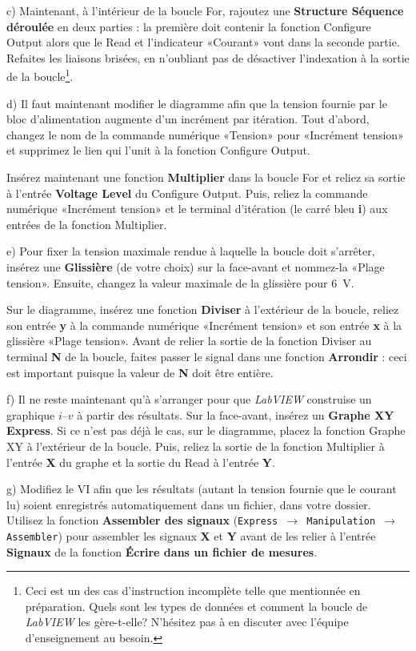 \documentclass[canadien,12pt,oneside,letterpaper]{article}
\begin{document}
c) Maintenant, à l'intérieur de la boucle For, rajoutez une \textbf{Structure Séquence déroulée} en deux parties : la première doit contenir la fonction Configure Output alors que le Read et l'indicateur «Courant» vont dans la seconde partie. Refaites les liaisons brisées, en n'oubliant pas de désactiver l'indexation à la sortie de la boucle\footnote{Ceci est un des cas d'instruction incomplète telle que mentionnée en préparation. Quels sont les types de données et comment la boucle de \textit{LabVIEW} les gère-t-elle? N'hésitez pas à en discuter avec l'équipe d'enseignement au besoin.}.

d) Il faut maintenant modifier le diagramme afin que la tension fournie par le bloc d'alimentation augmente d'un incrément par itération. Tout d'abord, changez le nom de la commande numérique «Tension» pour «Incrément tension» et supprimez le lien qui l'unit à la fonction Configure Output.

Insérez maintenant une fonction \textbf{Multiplier} dans la boucle For et reliez sa sortie à l'entrée \textbf{Voltage Level} du Configure Output. Puis, reliez la commande numérique «Incrément tension» et le terminal d'itération (le carré bleu \textbf{i}) aux entrées de la fonction Multiplier.

e) Pour fixer la tension maximale rendue à laquelle la boucle doit s'arrêter, insérez une \textbf{Glissière} (de votre choix) sur la face-avant et nommez-la «Plage tension». Ensuite, changez la valeur maximale de la glissière pour 6~V.

Sur le diagramme, insérez une fonction \textbf{Diviser} à l'extérieur de la boucle, reliez son entrée \textbf{y} à la commande numérique «Incrément tension» et son entrée \textbf{x} à la glissière «Plage tension». Avant de relier la sortie de la fonction Diviser au terminal \textbf{N} de la boucle, faites passer le signal dans une fonction \textbf{Arrondir} : ceci est important puisque la valeur de \textbf{N} doit être entière.

f) Il ne reste maintenant qu'à s'arranger pour que \textit{LabVIEW} construise un graphique $i$--$v$ à partir des résultats. Sur la face-avant, insérez un \textbf{Graphe XY Express}. Si ce n'est pas déjà le cas, sur le diagramme, placez la fonction Graphe XY à l'extérieur de la boucle. Puis, reliez la sortie de la fonction Multiplier à l'entrée \textbf{X} du graphe et la sortie du Read à l'entrée \textbf{Y}.

g) Modifiez le VI afin que les résultats (autant la tension fournie que le courant lu) soient enregistrés automatiquement dans un fichier, dans votre dossier. Utilisez la fonction \textbf{Assembler des signaux} (\texttt{Express $\rightarrow$ Manipulation $\rightarrow$ Assembler}) pour assembler les signaux \textbf{X} et \textbf{Y} avant de les relier à l'entrée \textbf{Signaux} de la fonction \textbf{Écrire dans un fichier de mesures}.
\end{document}
